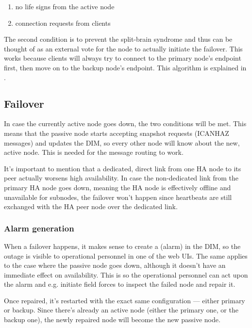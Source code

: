 \begin{enumerate}
\item no life signs from the active node
\item connection requests from clients
\end{enumerate}

The second condition is to prevent the split-brain syndrome and thus can be
thought of as an external vote for the node to actually initiate the failover.
This works because clients will always try to connect to the primary node's
endpoint first, then move on to the backup node's endpoint. This algorithm is
explained in \cite[Chapter 4 - Reliable Request-Reply Patterns, Client-Side
Reliability (Lazy Pirate Pattern)]{zmq:zguide}.

\subsection{Failover}
In case the currently active node goes down, the two conditions will be met.
This means that the passive node starts accepting snapshot requests (ICANHAZ
messages) and updates the DIM, so every other node will know about the new,
active node. This is needed for the message routing to work.

It's important to mention that a dedicated, direct link from one HA node to its
peer actually worsens high availability. In case the non-dedicated link from
the primary HA node goes down, meaning the HA node is effectively offline and
unavailable for subnodes, the failover won't happen since heartbeats are still
exchanged with the HA peer node over the dedicated link.

\subsubsection{Alarm generation}
When a failover happens, it makes sense to create a  (alarm) in the
DIM, so the outage is visible to operational personnel in one of the web UIs.
The same applies to the case where the passive node goes down, although it
doesn't have an immediate effect on availability.  This is so the operational
personnel can act upon the alarm and e.g. initiate field forces to inspect the
failed node and repair it.

Once repaired, it's restarted with the exact same configuration --- either primary
or backup. Since there's already an active node (either the primary one,
or the backup one), the newly repaired node will become the new passive node.

